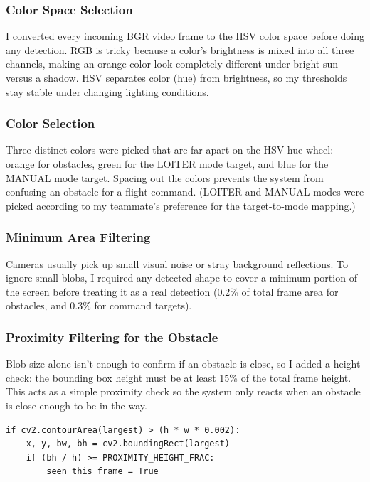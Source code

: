 \documentclass[12pt,a4paper]{article}
\begin{document}
\subsubsection{Color Space Selection}
I converted every incoming BGR video frame to the HSV color space
before doing any detection. RGB is tricky because a color's brightness
is mixed into all three channels, making an orange color look
completely different under bright sun versus a shadow. HSV separates
color (hue) from brightness, so my thresholds stay stable under
changing lighting conditions.

\subsubsection{Color Selection}
Three distinct colors were picked that are far apart on the HSV hue
wheel: orange for obstacles, green for the LOITER mode target, and blue
for the MANUAL mode target. Spacing out the colors prevents the system
from confusing an obstacle for a flight command. (LOITER and MANUAL
modes were picked according to my teammate's preference for the
target-to-mode mapping.)

\subsubsection{Minimum Area Filtering}
Cameras usually pick up small visual noise or stray background
reflections. To ignore small blobs, I required any detected shape to
cover a minimum portion of the screen before treating it as a real
detection (0.2\% of total frame area for obstacles, and 0.3\% for
command targets).

\subsubsection{Proximity Filtering for the Obstacle}
Blob size alone isn't enough to confirm if an obstacle is close, so I
added a height check: the bounding box height must be at least 15\% of
the total frame height. This acts as a simple proximity check so the
system only reacts when an obstacle is close enough to be in the way.

\begin{lstlisting}[style=pythonstyle, caption={Filtering out small noise and verifying obstacle proximity height.}]
if cv2.contourArea(largest) > (h * w * 0.002):
    x, y, bw, bh = cv2.boundingRect(largest)
    if (bh / h) >= PROXIMITY_HEIGHT_FRAC:
        seen_this_frame = True
\end{lstlisting}
\end{document}
